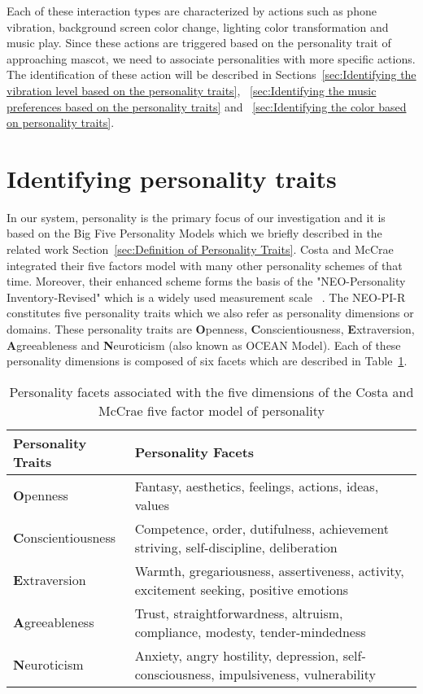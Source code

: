 Each of these interaction types are characterized by actions such as phone vibration,
background screen color change, lighting color transformation and music play.
Since these actions are triggered based on the personality trait of approaching mascot,
we need to associate personalities with more specific actions.
The identification of these action will be described in
Sections~\ref{sec:Identifying the vibration level based on the personality traits},
~\ref{sec:Identifying the music preferences based on the personality traits}
and ~\ref{sec:Identifying the color based on personality traits}.

\section{Identifying personality traits}
\label{sec:Identifying personality traits}

In our system, personality is the primary focus of our investigation and
it is based on the Big Five Personality Models which we briefly described
in the related work Section~\ref{sec:Definition of Personality Traits}.
Costa and McCrae integrated their five factors model with many other personality schemes of that time.
Moreover, their enhanced scheme forms the basis of the "NEO-Personality Inventory-Revised"
which is a widely used measurement scale ~\cite{costa2008revised}.
The NEO-PI-R constitutes five personality traits which we also refer as personality dimensions or domains.
These personality traits are \textbf{O}penness, \textbf{C}onscientiousness,
\textbf{E}xtraversion, \textbf{A}greeableness and \textbf{N}euroticism (also known as  OCEAN Model).
Each of these personality dimensions is composed of six facets which are described in Table~\ref{table:personality}.

\begin{table} [h]
\centering
\begin{tabular}{ | m{8em} | m{25em}| }
\hline
\textbf{Personality Traits} & \textbf{Personality Facets}  \\
\hline
\textbf{O}penness & Fantasy, aesthetics, feelings, actions, ideas, values  \\
\hline 
\textbf{C}onscientiousness & Competence, order, dutifulness, achievement striving, self-discipline, deliberation  \\
\hline 
\textbf{E}xtraversion & Warmth, gregariousness, assertiveness, activity, excitement seeking, positive emotions \\
\hline 
\textbf{A}greeableness & Trust, straightforwardness, altruism, compliance, modesty, tender-mindedness  \\
\hline 
\textbf{N}euroticism & Anxiety, angry hostility, depression, self-consciousness, impulsiveness, vulnerability \\
\hline
\end{tabular}
\caption{Personality facets associated with the five dimensions of the Costa and McCrae five factor model of personality}
\label{table:personality}
\end{table}

